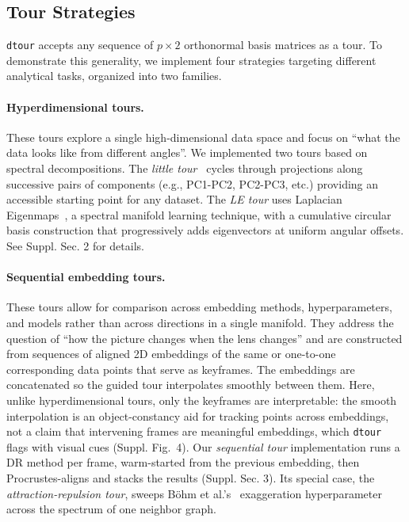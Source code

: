 \documentclass{vgtc}
\newcommand{\dtour}{\texorpdfstring{\texttt{dtour}\xspace}{dtour}}
\begin{document}
\subsection{Tour Strategies}
\label{sec:tour-strategies}

\dtour{} accepts any sequence of $p \times 2$ orthonormal basis matrices as a tour. To demonstrate this generality, we implement four strategies targeting different analytical tasks, organized into two families.

\paragraph{Hyperdimensional tours.}
These tours explore a single high-dimensional data space and focus on ``what the data looks like from different angles''. We implemented two tours based on spectral decompositions.
%
The \emph{little tour}~\cite{wickham2011tourr} cycles through projections along successive pairs of components (e.g., PC1-PC2, PC2-PC3, etc.) providing an accessible starting point for any dataset.
%
The \emph{LE tour} uses Laplacian Eigenmaps~\cite{Belkin2003-ea}, a spectral manifold learning technique, with a cumulative circular basis construction that progressively adds eigenvectors at uniform angular offsets. See Suppl. Sec. 2 for details.

\paragraph{Sequential embedding tours.}
These tours allow for comparison across embedding methods, hyperparameters, and models rather than across directions in a single manifold. They address the question of ``how the picture changes when the lens changes'' and are constructed from sequences of aligned 2D embeddings of the same or one-to-one corresponding data points that serve as keyframes. The embeddings are concatenated so the guided tour interpolates smoothly between them. Here, unlike hyperdimensional tours, only the keyframes are interpretable: the smooth interpolation is an object-constancy aid for tracking points across embeddings, not a claim that intervening frames are meaningful embeddings, which \dtour{} flags with visual cues (Suppl. Fig.~4).
%
Our \emph{sequential tour} implementation runs a DR method per frame, warm-started from the previous embedding, then Procrustes-aligns and stacks the results (Suppl. Sec. 3). Its special case, the \emph{attraction-repulsion tour}, sweeps Böhm et al.'s~\cite{boehm2022attraction} exaggeration hyperparameter across the spectrum of one neighbor graph.
\end{document}
